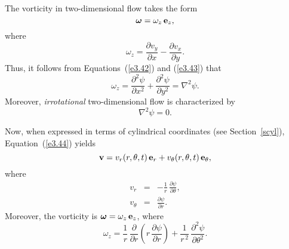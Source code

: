 The vorticity in two-dimensional flow takes the form
\begin{equation}
\mbox{\boldmath$\omega$} = \omega_z\,{\bf e}_z,
\end{equation}
where
\begin{equation}
\omega_z =  \frac{\partial v_y}{\partial x}-\frac{\partial v_x}{\partial y}.
\end{equation}
Thus, it follows from Equations~(\ref{e3.42}) and (\ref{e3.43}) that
\begin{equation}
\omega_z=\frac{\partial^2\psi}{\partial x^2}+\frac{\partial^2\psi}{\partial y^2}=\nabla^2\psi.  \label{e3.46}                                                                                                                                                                                                                                                                                                                                                                                                                                                                                                                                                                                                                                                                                       
\end{equation}
Moreover, {\em irrotational}\/ two-dimensional  flow is characterized by
\begin{equation}\label{e3.47}
\nabla^2\psi = 0.
\end{equation}

Now, when expressed in terms of cylindrical  coordinates (see Section~\ref{scyl}), Equation~(\ref{e3.44}) yields
\begin{equation}
{\bf v} = v_r(r,\theta,t)\,{\bf e}_r + v_\theta(r,\theta,t)\,{\bf e}_\theta,
\end{equation}
where
\begin{eqnarray}\label{e3.50}
v_r &=& - \frac{1}{r}\,\frac{\partial \psi}{\partial\theta},\\[0.5ex]
v_\theta &=& \frac{\partial\psi}{\partial r}.\label{e3.51}
\end{eqnarray}
Moreover, the vorticity is $\mbox{\boldmath$\omega$}= \omega_z\,{\bf e}_z$, where
\begin{equation}\label{e3.51x}
\omega_z =\frac{1}{r}\,\frac{\partial}{\partial r}\!\left(r\,\frac{\partial\psi}{\partial r}\right) + \frac{1}{r^{\,2}}\,\frac{\partial^2\psi}{\partial \theta^2}.
\end{equation}

